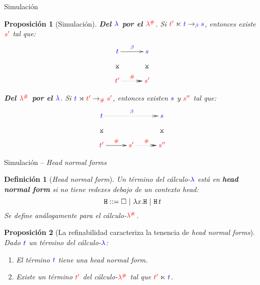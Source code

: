 \documentclass{beamer}
\newtheorem{defes}{Definición}
\newtheorem{proes}{Proposición}
\newcommand{\cLam}[1]{{\color{darkBlue} #1}}
\newcommand{\cDist}[1]{{\color{red} #1}}
\newcommand{\clambdadist}{\cDist{\lambdadist}}
\newcommand{\clambda}{\cLam{\lambda}}
\begin{document}
\begin{frame}{Simulación}
\begin{proes}[Simulación]
\textbf{Del $\clambda$ por el $\clambdadist$}.
Si $\cDist{\tm'} \refines \cLam{\tm} \to_{\cLam{\beta}} \cLam{\tmtwo}$,
entonces existe $\cDist{\tmtwo'}$ tal que:
\[
\xymatrix@=1cm{
 \cLam{\tm} \ar@{}[d]|*=0[@]{\rtimes} \ar[r]^{\cLam{\beta}} & \cLam{\tmtwo} \ar@{}[d]|*=0[@]{\rtimes} \\
 \cDist{\tm'} \ar@{.>>}[r]^{\cDist{\dist}} & \cDist{\tmtwo'} \\
}
\]

\textbf{Del $\clambdadist$ por el $\clambda$}.
Si $\cLam{\tm} \refinedby \cDist{\tm'} \to_{\cDist{\dist}} \cDist{\tmtwo'}$,
entonces existen $\cLam{\tmtwo}$ y $\cDist{\tmtwo''}$ tal que:
\[
\xymatrix@=1cm{
 \cLam{\tm} \ar@{}[d]|*=0[@]{\rtimes} \ar@{.>>}[rr]^{\cLam{\beta}} & & \cLam{\tmtwo} \ar@{}[d]|*=0[@]{\rtimes} \\
 \cDist{\tm'} \ar[r]^{\cDist{\dist}} & \cDist{\tmtwo'} \ar@{.>>}[r]^{\cDist{\dist}} & \cDist{\tmtwo''} \\
}
\]
\end{proes}
\end{frame}

\begin{frame}{Simulación -- \emph{Head normal forms}}
\begin{defes}[\emph{Head normal form}]
  Un término del cálculo-$\clambda$ está en \textbf{\emph{head normal form}} si no tiene redexes debajo de un contexto head:
\[ \mathtt{H} ::= \Box \ | \ \lambda x. \mathtt{H} \ | \ \mathtt{H}\, t \]
Se define análogamente para el cálculo-$\clambdadist$.
\end{defes}

\begin{proes}[{\footnotesize La refinabilidad caracteriza la tenencia de \emph{head normal forms}}]
Dado $\cLam{t}$ un término del cálculo-$\clambda$:
\begin{enumerate}
\item El término $\cLam{t}$ tiene una \emph{head normal form}.
\item Existe un término $\cDist{t'}$ del cálculo-$\clambdadist$ tal que $\cDist{t'} \refines \cLam{t}$.
\end{enumerate}
\end{proes}
\end{frame}
\end{document}

